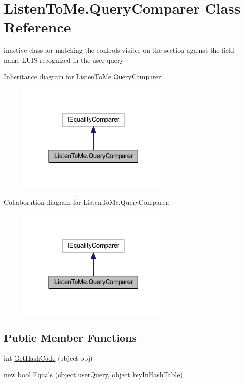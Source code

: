 \hypertarget{class_listen_to_me_1_1_query_comparer}{}\section{Listen\+To\+Me.\+Query\+Comparer Class Reference}
\label{class_listen_to_me_1_1_query_comparer}


inactive class for matching the controls visible on the section against the field name L\+U\+IS recognized in the user query  




Inheritance diagram for Listen\+To\+Me.\+Query\+Comparer\+:
\nopagebreak
\begin{figure}[H]
\begin{center}
\leavevmode
\includegraphics[width=218pt]{class_listen_to_me_1_1_query_comparer__inherit__graph}
\end{center}
\end{figure}


Collaboration diagram for Listen\+To\+Me.\+Query\+Comparer\+:
\nopagebreak
\begin{figure}[H]
\begin{center}
\leavevmode
\includegraphics[width=218pt]{class_listen_to_me_1_1_query_comparer__coll__graph}
\end{center}
\end{figure}
\subsection*{Public Member Functions}
\begin{DoxyCompactItemize}
\item 
int \hyperlink{class_listen_to_me_1_1_query_comparer_a700125ab1c7ee15c31485a1d1ca71a70}{Get\+Hash\+Code} (object obj)
\item 
new bool \hyperlink{class_listen_to_me_1_1_query_comparer_a8c5ce93e1d11dcebbcc0693d4c425169}{Equals} (object user\+Query, object key\+In\+Hash\+Table)
\end{DoxyCompactItemize}


